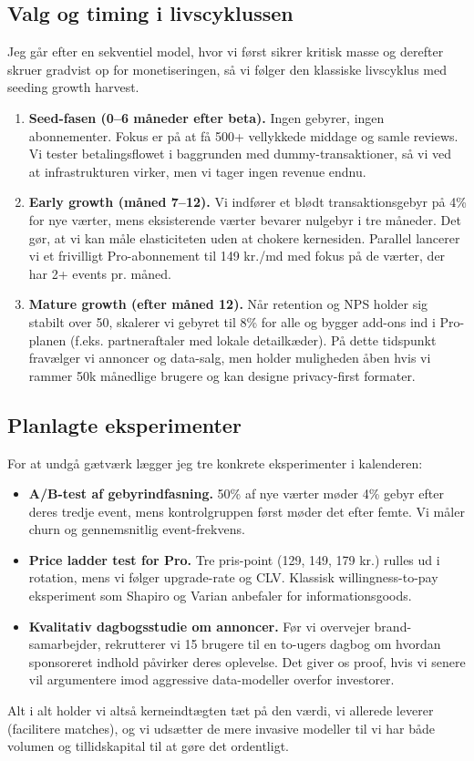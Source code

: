\subsection*{Valg og timing i livscyklussen}
Jeg går efter en sekventiel model, hvor vi først sikrer kritisk masse og derefter skruer gradvist op for monetiseringen, så vi følger den klassiske livscyklus med seeding \textrightarrow{} growth \textrightarrow{} harvest.\citep{Choudary2016}
\begin{enumerate}
  \item \textbf{Seed-fasen (0--6 måneder efter beta).} Ingen gebyrer, ingen abonnementer. Fokus er på at få 500+ vellykkede middage og samle reviews. Vi tester betalingsflowet i baggrunden med dummy-transaktioner, så vi ved at infrastrukturen virker, men vi tager ingen revenue endnu.
  \item \textbf{Early growth (måned 7--12).} Vi indfører et blødt transaktionsgebyr på 4\% for nye værter, mens eksisterende værter bevarer nulgebyr i tre måneder. Det gør, at vi kan måle elasticiteten uden at chokere kernesiden. Parallel lancerer vi et frivilligt Pro-abonnement til 149 kr./md med fokus på de værter, der har 2+ events pr. måned.
  \item \textbf{Mature growth (efter måned 12).} Når retention og NPS holder sig stabilt over 50, skalerer vi gebyret til 8\% for alle og bygger add-ons ind i Pro-planen (f.eks. partneraftaler med lokale detailkæder). På dette tidspunkt fravælger vi annoncer og data-salg, men holder muligheden åben hvis vi rammer 50k månedlige brugere og kan designe privacy-first formater.
\end{enumerate}

\subsection*{Planlagte eksperimenter}
For at undgå gætværk lægger jeg tre konkrete eksperimenter i kalenderen:
\begin{itemize}
  \item \textbf{A/B-test af gebyrindfasning.} 50\% af nye værter møder 4\% gebyr efter deres tredje event, mens kontrolgruppen først møder det efter femte. Vi måler churn og gennemsnitlig event-frekvens.
  \item \textbf{Price ladder test for Pro.} Tre pris-point (129, 149, 179 kr.) rulles ud i rotation, mens vi følger upgrade-rate og CLV. Klassisk willingness-to-pay eksperiment som Shapiro og Varian anbefaler for informationsgoods.\citep{ShapiroVarian1999}
  \item \textbf{Kvalitativ dagbogsstudie om annoncer.} Før vi overvejer brand-samarbejder, rekrutterer vi 15 brugere til en to-ugers dagbog om hvordan sponsoreret indhold påvirker deres oplevelse. Det giver os proof, hvis vi senere vil argumentere imod aggressive data-modeller overfor investorer.
\end{itemize}

Alt i alt holder vi altså kerneindtægten tæt på den værdi, vi allerede leverer (facilitere matches), og vi udsætter de mere invasive modeller til vi har både volumen og tillidskapital til at gøre det ordentligt.
